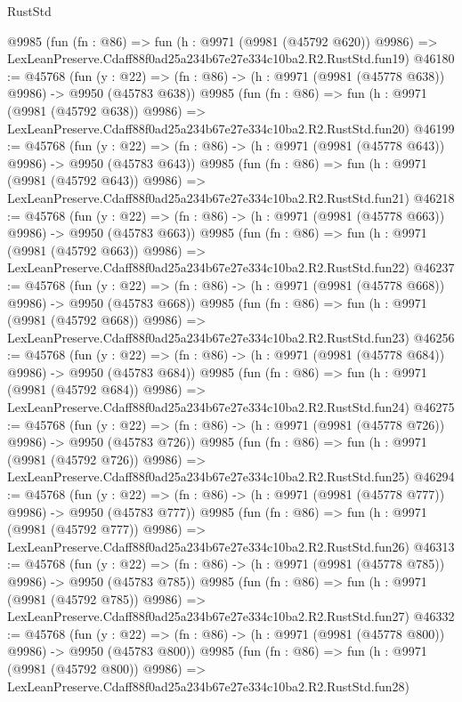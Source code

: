 \begin{lexlean}{RustStd}
\begin{coremodule}
    @9985
    (fun (fn : @86) =>
    fun (h : @9971 (@9981 (@45792 @620)) @9986) =>
    LexLeanPreserve.Cdaff88f0ad25a234b67e27e334c10ba2.R2.RustStd.fun19)
@46180 := @45768
    (fun (y : @22) => (fn : @86) -> (h : @9971 (@9981 (@45778 @638)) @9986) -> @9950 (@45783 @638))
    @9985
    (fun (fn : @86) =>
    fun (h : @9971 (@9981 (@45792 @638)) @9986) =>
    LexLeanPreserve.Cdaff88f0ad25a234b67e27e334c10ba2.R2.RustStd.fun20)
@46199 := @45768
    (fun (y : @22) => (fn : @86) -> (h : @9971 (@9981 (@45778 @643)) @9986) -> @9950 (@45783 @643))
    @9985
    (fun (fn : @86) =>
    fun (h : @9971 (@9981 (@45792 @643)) @9986) =>
    LexLeanPreserve.Cdaff88f0ad25a234b67e27e334c10ba2.R2.RustStd.fun21)
@46218 := @45768
    (fun (y : @22) => (fn : @86) -> (h : @9971 (@9981 (@45778 @663)) @9986) -> @9950 (@45783 @663))
    @9985
    (fun (fn : @86) =>
    fun (h : @9971 (@9981 (@45792 @663)) @9986) =>
    LexLeanPreserve.Cdaff88f0ad25a234b67e27e334c10ba2.R2.RustStd.fun22)
@46237 := @45768
    (fun (y : @22) => (fn : @86) -> (h : @9971 (@9981 (@45778 @668)) @9986) -> @9950 (@45783 @668))
    @9985
    (fun (fn : @86) =>
    fun (h : @9971 (@9981 (@45792 @668)) @9986) =>
    LexLeanPreserve.Cdaff88f0ad25a234b67e27e334c10ba2.R2.RustStd.fun23)
@46256 := @45768
    (fun (y : @22) => (fn : @86) -> (h : @9971 (@9981 (@45778 @684)) @9986) -> @9950 (@45783 @684))
    @9985
    (fun (fn : @86) =>
    fun (h : @9971 (@9981 (@45792 @684)) @9986) =>
    LexLeanPreserve.Cdaff88f0ad25a234b67e27e334c10ba2.R2.RustStd.fun24)
@46275 := @45768
    (fun (y : @22) => (fn : @86) -> (h : @9971 (@9981 (@45778 @726)) @9986) -> @9950 (@45783 @726))
    @9985
    (fun (fn : @86) =>
    fun (h : @9971 (@9981 (@45792 @726)) @9986) =>
    LexLeanPreserve.Cdaff88f0ad25a234b67e27e334c10ba2.R2.RustStd.fun25)
@46294 := @45768
    (fun (y : @22) => (fn : @86) -> (h : @9971 (@9981 (@45778 @777)) @9986) -> @9950 (@45783 @777))
    @9985
    (fun (fn : @86) =>
    fun (h : @9971 (@9981 (@45792 @777)) @9986) =>
    LexLeanPreserve.Cdaff88f0ad25a234b67e27e334c10ba2.R2.RustStd.fun26)
@46313 := @45768
    (fun (y : @22) => (fn : @86) -> (h : @9971 (@9981 (@45778 @785)) @9986) -> @9950 (@45783 @785))
    @9985
    (fun (fn : @86) =>
    fun (h : @9971 (@9981 (@45792 @785)) @9986) =>
    LexLeanPreserve.Cdaff88f0ad25a234b67e27e334c10ba2.R2.RustStd.fun27)
@46332 := @45768
    (fun (y : @22) => (fn : @86) -> (h : @9971 (@9981 (@45778 @800)) @9986) -> @9950 (@45783 @800))
    @9985
    (fun (fn : @86) =>
    fun (h : @9971 (@9981 (@45792 @800)) @9986) =>
    LexLeanPreserve.Cdaff88f0ad25a234b67e27e334c10ba2.R2.RustStd.fun28)

\end{coremodule}
\end{lexlean}
